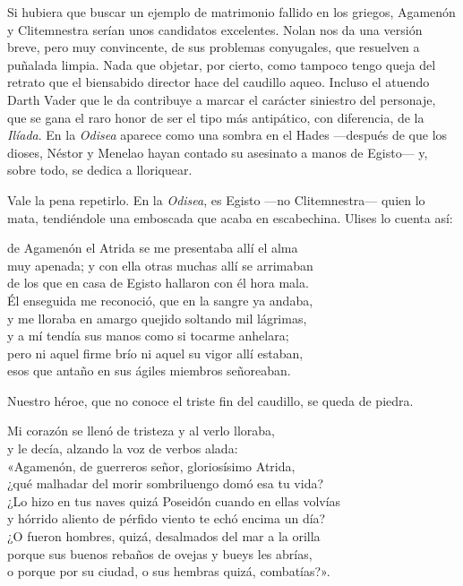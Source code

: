 \label{cap:agamenon}

Si hubiera que buscar un ejemplo de matrimonio fallido en los griegos, Agamenón y Clitemnestra serían unos candidatos excelentes. Nolan nos da una versión breve, pero muy convincente, de sus problemas conyugales, que resuelven a puñalada limpia. Nada que objetar, por cierto, como tampoco tengo queja del retrato que el biensabido director hace del caudillo aqueo. Incluso el atuendo Darth Vader que le da contribuye a marcar el carácter siniestro del personaje, que se gana el raro honor de ser el tipo más antipático, con diferencia, de la \emph{Ilíada}. En la \emph{Odisea} aparece como una sombra en el Hades ---después de que los dioses, Néstor y Menelao hayan contado su asesinato a manos de Egisto--- y, sobre todo, se dedica a lloriquear.

Vale la pena repetirlo. En la \emph{Odisea}, es Egisto ---no Clitemnestra--- quien lo mata, tendiéndole una emboscada que acaba en escabechina. Ulises lo cuenta así:

\begin{versocita}
de Agamenón el Atrida se me presentaba allí el alma\\
muy apenada; y con ella otras muchas allí se arrimaban\\
de los que en casa de Egisto hallaron con él hora mala.\\
Él enseguida me reconoció, que en la sangre ya andaba,\\
y me lloraba en amargo quejido soltando mil lágrimas,\\
y a mí tendía sus manos como si tocarme anhelara;\\
pero ni aquel firme brío ni aquel su vigor allí estaban,\\
esos que antaño en sus ágiles miembros señoreaban.
\end{versocita}

Nuestro héroe, que no conoce el triste fin del caudillo, se queda de piedra.

\begin{versocita}
Mi corazón se llenó de tristeza y al verlo lloraba,\\
y le decía, alzando la voz de verbos alada:\\
\stanzabreak
«Agamenón, de guerreros señor, gloriosísimo Atrida,\\
¿qué malhadar del morir sombriluengo domó esa tu vida?\\
¿Lo hizo en tus naves quizá Poseidón cuando en ellas volvías\\
y hórrido aliento de pérfido viento te echó encima un día?\\
¿O fueron hombres, quizá, desalmados del mar a la orilla\\
porque sus buenos rebaños de ovejas y bueys les abrías,\\
o porque por su ciudad, o sus hembras quizá, combatías?».
\end{versocita}

